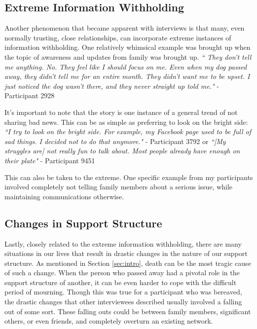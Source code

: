   \subsection{Extreme Information Withholding}
  Another phenomenon that became apparent with interviews is that
  many, even normally trusting, close relationships,
  can incorporate extreme instances of information withholding.
  One relatively whimsical example was brought up
  when the topic of awareness and updates from family was brought up.
  \textit{
    ``
    They don't tell me anything. No.
    They feel like I should focus on me.
    Even when my dog passed away, they didn't tell me for an entire month.
    They didn't want me to be upset.
    I just noticed the dog wasn't there, and they never straight up told me."
  } - Participant 2928

  It's important to note that the story is one instance of a general
  trend of not sharing bad news.
  This can be as simple as preferring to look on the bright side:
  \textit{
  ``I try to look on the bright side.
  For example, my Facebook page used to be full of sad things.
  I decided not to do that anymore."
  } - Participant 3792
  or \textit{
  ``[My struggles are] not really fun to talk about.
  Most people already have enough on their plate"
  }
  - Participant 9451
  
  This can also be taken to the extreme.
  One specific example from my participants involved
  completely not telling family members about a serious issue,
  while maintaining communications otherwise.

  \subsection{Changes in Support Structure}
  Lastly, closely related to the extreme information withholding,
  there are many situations in our lives that result in
  drastic changes in the nature of our support structure.
  As mentioned in Section \ref{sec:intro},
  death can be the most tragic cause of such a change.
  When the person who passed away had a pivotal role in the support
  structure of another, it can be even harder to cope with
  the difficult period of mourning.
  Though this was true for a participant who was bereaved,
  the drastic changes that other interviewees described usually involved
  a falling out of some sort.
  These falling outs could be between family members,
  significant others, or even friends,
  and completely overturn an existing network.

